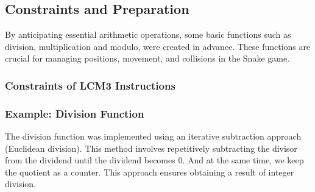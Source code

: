 \documentclass{article}
\begin{document}
\subsection{Constraints and Preparation}
 By anticipating essential arithmetic operations, some basic functions such as division, multiplication and modulo, were created in advance. These functions are crucial for managing positions, movement, and collisions in the Snake game.

\subsubsection{Constraints of LCM3 Instructions}
\subsubsection{Example: Division Function}
The division function was implemented using an iterative subtraction approach (Euclidean division). This method involves repetitively subtracting the divisor from the dividend until the dividend becomes 0. And at the same time, we keep the quotient as a counter. This approach ensures obtaining a result of integer division.\\
\end{document}
